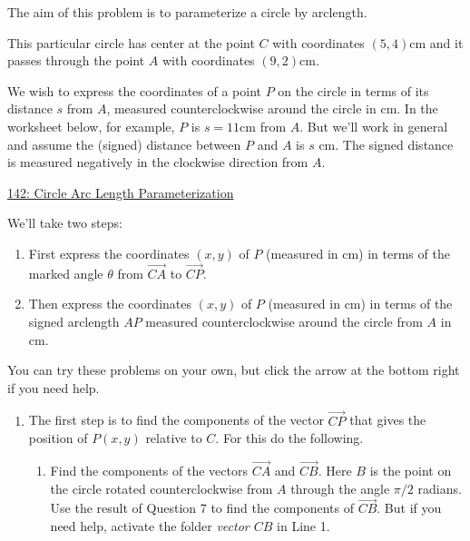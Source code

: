 \documentclass{ximera}
\begin{document}
\begin{question} \label{QWEercfe341}

The aim of this problem is to parameterize a circle by arclength.

This particular circle has center at the point $C$ with coordinates $(5,4)$cm and it passes through the point $A$ with coordinates $(9,2)$cm. 

We wish to express the coordinates of a point $P$ on the circle in terms of its distance $s$ from $A$, measured counterclockwise around the circle in cm. In the worksheet below, for example, $P$ is $s=11$cm from $A$. But we'll work in general and assume the (signed) distance between $P$ and $A$ is $s$ cm. The signed distance is measured negatively in the clockwise direction from $A$.

\begin{onlineOnly}
    \begin{center}
\end{center}
\end{onlineOnly}

\href{https://www.desmos.com/calculator/kuwm2chgyu}{142: Circle Arc Length Parameterization}


We'll take two steps:

\begin{enumerate}
\item First express the coordinates $(x,y)$ of $P$ (measured in cm) in terms of the marked angle $\theta$ from $\overrightarrow{CA}$ to $\overrightarrow{CP}$.

\item Then express the coordinates $(x,y)$ of $P$ (measured in cm) in terms of the signed arclength $AP$ measured counterclockwise around the circle from $A$ in cm. 
\end{enumerate}

You can try these problems on your own, but click the arrow at the bottom right if you need help.

\begin{expandable}

\begin{enumerate}
\item The first step is to find the components of the vector $\overrightarrow{CP}$ that gives the position of $P(x,y)$ relative to $C$. For this do the following.

\begin{enumerate}
\item Find the components of the vectors $\overrightarrow{CA}$ and $\overrightarrow{CB}$.  Here $B$ is the point on the circle rotated counterclockwise from $A$ through the angle $\pi/2$ radians. Use the result of Question 7 to find the components of $\overrightarrow{CB}$. But if you need help, activate the folder \emph{vector $CB$} in Line 1.


\end{enumerate}
\end{enumerate}
\end{expandable}
\end{question}
\end{document}
